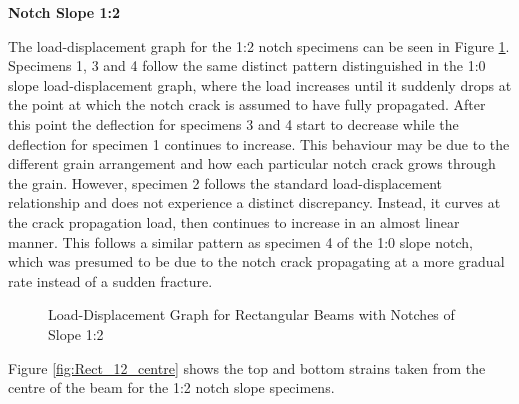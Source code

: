 \documentclass[11pt,a4paper]{article}
\numberwithin{equation}{subsection}
\begin{document}
\noindent
\textbf{Notch Slope 1:2}\par
\noindent
The load-displacement graph for the 1:2 notch specimens can be seen in Figure \ref{fig:Rect_12_def}. Specimens 1, 3 and 4 follow the same distinct pattern distinguished in the 1:0 slope load-displacement graph, where the load increases until it suddenly drops at the point at which the notch crack is assumed to have fully propagated. After this point the deflection for specimens 3 and 4 start to decrease while the deflection for specimen 1 continues to increase. This behaviour may be due to the different grain arrangement and how each particular notch crack grows through the grain. However, specimen 2 follows the standard load-displacement relationship and does not experience a distinct discrepancy. Instead, it curves at the crack propagation load, then continues to increase in an almost linear manner. This follows a similar pattern as specimen 4 of the 1:0 slope notch, which was presumed to be due to the notch crack propagating at a more gradual rate instead of a sudden fracture. 

\vspace*{\baselineskip}

\begin{figure}[h]
	\begin{center}
	\end{center}
	\caption{Load-Displacement Graph for Rectangular Beams with Notches of Slope 1:2}
	\label{fig:Rect_12_def}
\end{figure}

\noindent
Figure \ref{fig:Rect_12_centre} shows the top and bottom strains taken from the centre of the beam for the 1:2 notch slope specimens. 
\end{document}
